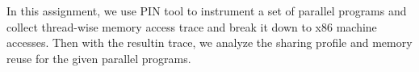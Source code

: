 

In this assignment, we use PIN tool to instrument a set of parallel programs and collect
thread-wise memory access trace and break it down to x86 machine accesses. Then with the resultin trace,
we analyze the sharing profile and memory reuse for the given parallel programs.